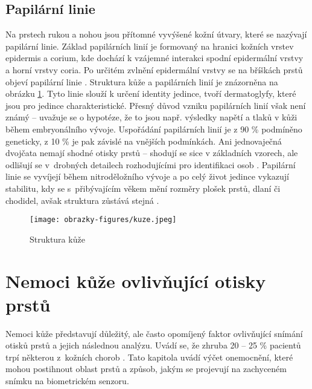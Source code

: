 \subsection*{Papilární linie}
Na prstech rukou a nohou jsou přítomné vyvýšené kožní útvary, které se nazývají papilární linie. Základ papilárních linií je formovaný na hranici kožních vrstev epidermis a corium, kde dochází k vzájemné interakci spodní epidermální vrstvy a horní vrstvy coria. Po určitém zvlnění epidermální vrstvy se na bříškách prstů objeví papilární linie \cite{DermatologickeFaktory}. Struktura kůže a papilárních linií je znázorněna na obrázku \ref{fig:kuze}. Tyto linie slouží k určení identity jedince, tvoří dermatoglyfy, které jsou pro jedince charakteristické. Přesný důvod vzniku papilárních linií však není známý -- uvažuje se o hypotéze, že to jsou např. výsledky napětí a tlaků v kůži během embryonálního vývoje. Uspořádání papilárních linií je z 90 \% podmíněno geneticky, z 10 \% je pak závislé na vnějších podmínkách. Ani jednovaječná dvojčata nemají shodné otisky prstů -- shodují se sice v základních vzorech, ale odlišují se v~drobných detailech rozhodujícími pro identifikaci osob \cite{Dermatoglyfika}. Papilární linie se vyvíjejí během nitroděložního vývoje a po celý život jedince vykazují stabilitu, kdy se s~přibývajícím věkem mění rozměry plošek prstů, dlaní či chodidel, avšak struktura zůstává stejná \cite{DermatologickeFaktory}. \\

\begin{figure}[!htbp]
    \centering
    \texttt{[image: obrazky-figures/kuze.jpeg]}
    \caption{Struktura kůže \cite{DermatologickeFaktory}}
    \label{fig:kuze}
\end{figure}

\section{Nemoci kůže ovlivňující otisky prstů}
\label{sec:nemoci}
Nemoci kůže představují důležitý, ale často opomíjený faktor ovlivňující snímání otisků prstů a jejich následnou analýzu. Uvádí se, že zhruba 20 -- 25 \% pacientů trpí některou z~kožních chorob \cite{InfluenceSkinDiseases}. Tato kapitola uvádí výčet onemocnění, které mohou postihnout oblast prstů a způsob, jakým se projevují na zachyceném snímku na biometrickém senzoru. 
